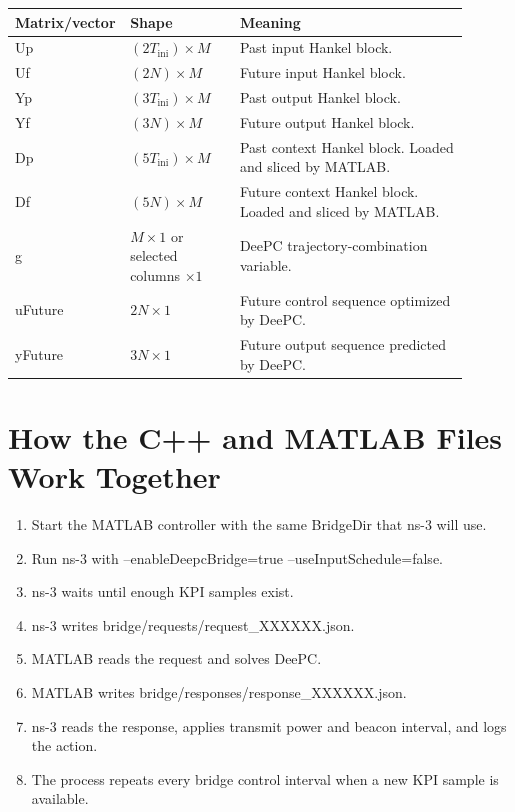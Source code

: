 \documentclass[11pt]{article}
\DeclareRobustCommand{\code}[1]{\texttt{\detokenize{#1}}}
\def\code#1{#1}%
\begin{document}
\begin{center}
\begin{tabular}{L{0.16\linewidth}L{0.24\linewidth}L{0.50\linewidth}}
\toprule
Matrix/vector & Shape & Meaning \\
\midrule
\code{Up} & \((2T_{\mathrm{ini}}) \times M\) &
Past input Hankel block. \\
\code{Uf} & \((2N) \times M\) &
Future input Hankel block. \\
\code{Yp} & \((3T_{\mathrm{ini}}) \times M\) &
Past output Hankel block. \\
\code{Yf} & \((3N) \times M\) &
Future output Hankel block. \\
\code{Dp} & \((5T_{\mathrm{ini}}) \times M\) &
Past context Hankel block.  Loaded and sliced by MATLAB. \\
\code{Df} & \((5N) \times M\) &
Future context Hankel block.  Loaded and sliced by MATLAB. \\
\code{g} & \(M \times 1\) or selected columns \(\times 1\) &
DeePC trajectory-combination variable. \\
\code{uFuture} & \(2N \times 1\) &
Future control sequence optimized by DeePC. \\
\code{yFuture} & \(3N \times 1\) &
Future output sequence predicted by DeePC. \\
\bottomrule
\end{tabular}
\end{center}

\section{How the C++ and MATLAB Files Work Together}

\begin{enumerate}
  \item Start the MATLAB controller with the same \code{BridgeDir} that ns-3 will
  use.
  \item Run ns-3 with \code{--enableDeepcBridge=true --useInputSchedule=false}.
  \item ns-3 waits until enough KPI samples exist.
  \item ns-3 writes \code{bridge/requests/request_XXXXXX.json}.
  \item MATLAB reads the request and solves DeePC.
  \item MATLAB writes \code{bridge/responses/response_XXXXXX.json}.
  \item ns-3 reads the response, applies transmit power and beacon interval, and
  logs the action.
  \item The process repeats every bridge control interval when a new KPI sample is
  available.
\end{enumerate}
\end{document}
